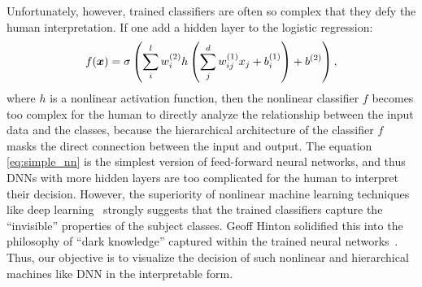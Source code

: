 %
Unfortunately, however, trained classifiers are often so complex that
they defy the human interpretation.
%
If one add a hidden layer to the logistic regression:
\begin{equation}
 \label{eq:simple_nn}
f(\mbox{\boldmath $x$}) = \sigma \left(\sum_{i}^{l} w_{i}^{(2)} h
\left(\sum_{j}^{d} w_{ij}^{(1)} x_{j} + b_{i}^{(1)}\right) +
b^{(2)}\right),
\end{equation}
where $h$ is a nonlinear activation function,
then the nonlinear classifier $f$ becomes too complex for the human to
directly analyze the relationship between the input data and the classes,
because the hierarchical architecture of the classifier $f$ masks the
direct connection between the input and output.
%
The equation \eqref{eq:simple_nn} is the simplest version of
feed-forward neural networks, and thus DNNs with more hidden layers are
too complicated for the human to interpret their decision.
%
However, the superiority of nonlinear machine learning techniques like deep
learning~\cite{krizhevsky2012imagenet,seide2011conversational,DeepFace} strongly suggests that the trained classifiers
capture the ``invisible'' properties of the subject classes.
%
Geoff Hinton solidified this into the philosophy of
``dark knowledge'' captured within the trained neural networks~\cite{DarkKnowledge}.
%
Thus, our objective is to visualize the decision of such nonlinear and hierarchical machines like DNN
in the interpretable form.

